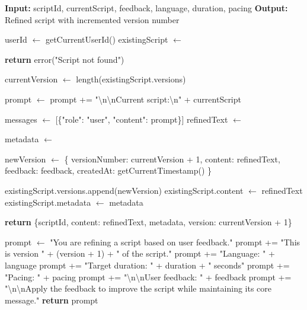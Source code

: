 \begin{algorithm}[H]
\caption{Feedback-Based Script Refinement}
\begin{algorithmic}[1]
\State \textbf{Input:} scriptId, currentScript, feedback, language, duration, pacing
\State \textbf{Output:} Refined script with incremented version number

    \State userId $\gets$ getCurrentUserId()
    \State existingScript $\gets$ 
    
        \State \textbf{return} error("Script not found")
    \EndIf
    
    \State currentVersion $\gets$ length(existingScript.versions)
    
    \State prompt $\gets$ 
    \State prompt += "\textbackslash n\textbackslash nCurrent script:\textbackslash n" + currentScript
    
    \State messages $\gets$ [\{"role": "user", "content": prompt\}]
    \State refinedText $\gets$ 
    
    \State metadata $\gets$ 
    
    \State newVersion $\gets$ \{
        \State \quad versionNumber: currentVersion + 1,
        \State \quad content: refinedText,
        \State \quad feedback: feedback,
        \State \quad createdAt: getCurrentTimestamp()
    \State \}
    
    \State existingScript.versions.append(newVersion)
    \State existingScript.content $\gets$ refinedText
    \State existingScript.metadata $\gets$ metadata
    
    \State {}
    
    \State \textbf{return} \{scriptId, content: refinedText, metadata, version: currentVersion + 1\}
\EndProcedure

    \State prompt $\gets$ "You are refining a script based on user feedback."
    \State prompt += "This is version " + (version + 1) + " of the script."
    \State prompt += "Language: " + language
    \State prompt += "Target duration: " + duration + " seconds"
    \State prompt += "Pacing: " + pacing
    \State prompt += "\textbackslash n\textbackslash nUser feedback: " + feedback
    \State prompt += "\textbackslash n\textbackslash nApply the feedback to improve the script while maintaining its core message."
    \State \textbf{return} prompt
\EndProcedure
\end{algorithmic}
\end{algorithm}

